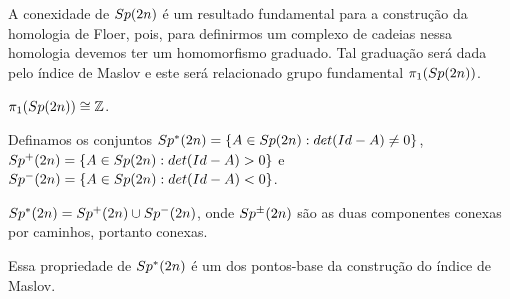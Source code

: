 \documentclass{beamer}
\begin{document}
\begin{frame}
	A conexidade de $Sp(2n)$ é um resultado fundamental para a construção da homologia de Floer, pois, para definirmos um complexo de cadeias nessa homologia devemos ter um homomorfismo graduado. Tal graduação será dada pelo índice de Maslov e este será relacionado grupo fundamental $\pi_{1}(Sp(2n))$.
	
	\begin{teorema}
		$\pi_{1}(Sp(2n)) \cong \mathbb{Z}$.
	\end{teorema}
\end{frame}

\begin{frame}
	Definamos os conjuntos $Sp^{*}(2n) = \{ A \in Sp(2n): det(Id-A)\neq 0 \}$, $Sp^{+}(2n) = \{ A \in Sp(2n): det(Id-A)> 0 \}$ e  $Sp^{-}(2n) = \{ A \in Sp(2n): det(Id-A)< 0 \}$.

	\begin{lema}
		$Sp^{*}(2n) = Sp^{+}(2n)\cup Sp^{-}(2n)$, onde $Sp^{\pm}(2n)$ são as duas componentes conexas por caminhos, portanto conexas.
	\end{lema}
	
	Essa propriedade de $Sp^{*}(2n)$ é um dos pontos-base da construção do índice de Maslov.
\end{frame}
\end{document}
